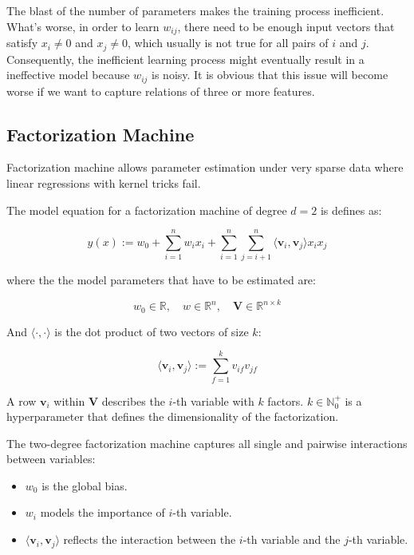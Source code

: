         The blast of the number of parameters makes the training process inefficient.
        What's worse, in order to learn $w_{ij}$,
        there need to be enough input vectors that satisfy $x_i \neq 0$ and $x_j \neq 0$,
        which usually is not true for all pairs of $i$ and $j$.
        Consequently, the inefficient learning process might eventually result in a ineffective model
        because $w_{ij}$ is noisy.
        It is obvious that this issue will become worse if we want to capture relations of three or more features.

    \subsection{Factorization Machine}

        Factorization machine allows parameter estimation under very sparse data
        where linear regressions with kernel tricks fail. \cite{Rendle2010}

        The model equation for a factorization machine of degree $d=2$ is defines as:

        \begin{equation}
        y(x) := w_0 + \sum_{i=1}^n w_i x_i + \sum_{i=1}^n\sum_{j=i+1}^n \langle \bm{v}_i, \bm{v}_j \rangle x_ix_j
        \label{eq:fm}
        \end{equation}

        where the the model parameters that have to be estimated are:

        \[
        w_0 \in \mathbb{R}, \quad w \in \mathbb{R}^n, \quad \bm{V} \in \mathbb{R}^{n \times k}
        \]

        And $\langle \cdot, \cdot \rangle$ is the dot product of two vectors of size $k$:

        \[
        \langle \bm{v}_i, \bm{v}_j \rangle := \sum_{f=1}^k v_{if}v_{jf}
        \]

        A row $\bm{v}_i$ within $\bm{V}$ describes the $i$-th variable with $k$ factors.
        $k \in \mathbb{N}_0^+$ is a hyperparameter that defines the dimensionality of the factorization.

        The two-degree factorization machine captures all single and pairwise interactions between variables:

        \begin{itemize}
            \item $w_0$ is the global bias.
            \item $w_i$ models the importance of $i$-th variable.
            \item $\langle \bm{v}_i, \bm{v}_j \rangle$ reflects the interaction
                between the $i$-th variable and the $j$-th variable.
        \end{itemize}

